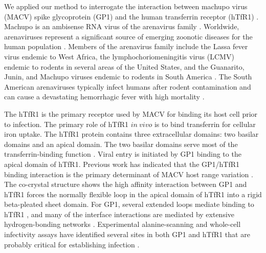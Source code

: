 \documentclass[12pt]{article} %
\providecommand{\DIFaddbegin}{} %
\providecommand{\DIFaddend}{} %
\providecommand{\DIFdelbegin}{} %
\providecommand{\DIFdelend}{} %
\begin{document}
We applied our method to interrogate the interaction between machupo virus (MACV) spike glycoprotein (GP1) and the human transferrin receptor (hTfR1) \DIFdelbegin %
\DIFdelend \DIFaddbegin \citep{Abraham2010,Charrel2003}\DIFaddend . Machupo is an ambisense RNA virus of the arenavirus family \DIFdelbegin %
\DIFdelend \DIFaddbegin \citep{Charrel2003}\DIFaddend . Worldwide, arenaviruses represent a significant source of emerging zoonotic diseases for the human population \DIFdelbegin %
\DIFdelend \DIFaddbegin \citep{Charrel2003}\DIFaddend . Members of the arenavirus family include the Lassa fever virus endemic to West Africa, the lymphochoriomeningitis virus (LCMV) endemic to rodents in several areas of the United States, and the Guanarito, Junin, and Machupo viruses endemic to rodents in South America \DIFdelbegin %
\DIFdelend \DIFaddbegin \citep{Charrel2003}\DIFaddend . The South American arenaviruses typically infect humans after rodent contamination and can cause a devastating hemorrhagic fever with high mortality \DIFdelbegin %
\DIFdelend \DIFaddbegin \citep{Charrel2003}\DIFaddend .

The hTfR1 is the primary receptor used by MACV for binding its host cell prior to infection. The primary role of hTfR1 $in~vivo$ is to bind transferrin for cellular iron uptake. The hTfR1 protein contains three extracellular domains: two basilar domains and an apical domain. The two basilar domains serve most of the transferrin-binding function \DIFdelbegin %
\DIFdelend \DIFaddbegin \citep{Abraham2010,Rad20112}\DIFaddend . Viral entry is initiated by GP1 binding to the apical domain of hTfR1. Previous work has indicated that the GP1/hTfR1 binding interaction is the primary determinant of MACV host range variation \DIFdelbegin %
\DIFdelend \DIFaddbegin \citep{Rad20111,Rad20112}\DIFaddend . The co-crystal structure shows the high affinity interaction between GP1 and hTfR1 forces the normally flexible loop in the apical domain of hTfR1 into a rigid beta-pleated sheet domain. For GP1, several extended loops mediate binding to hTfR1 \DIFdelbegin %
\DIFdelend \DIFaddbegin \citep{Abraham2010,Rad20112}\DIFaddend , and many of the interface interactions are mediated by extensive hydrogen-bonding networks \DIFdelbegin %
\DIFdelend \DIFaddbegin \citep{Abraham2010}\DIFaddend . Experimental alanine-scanning and whole-cell infectivity assays have identified several sites in both GP1 and hTfR1 that are probably critical for establishing infection \DIFdelbegin %
\DIFdelend \DIFaddbegin \citep{Rad20111,Rad20112}\DIFaddend .
\end{document}
